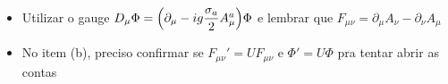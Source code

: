 \begin{itemize}
    \item Utilizar o gauge $D_{\mu}\Phi = \qty(\partial_{\mu} - ig\dfrac{\sigma_{a}}{2}A_{\mu}^{a})\Phi$ e lembrar que $F_{\mu\nu} = \partial_{\mu}A_{\nu} - \partial_{\nu}A_{\mu}$
    \item No item (b), preciso confirmar se $F_{\mu\nu}' = UF_{\mu\nu}$ e $\Phi' = U\Phi$ pra tentar abrir as contas
\end{itemize}
